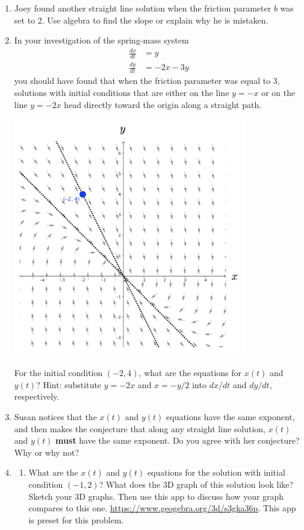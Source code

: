 \begin{enumerate}
\item	Joey found another straight line solution when the friction parameter $b$ was set to 2. Use algebra to find the slope or explain why he is mistaken. \label{10problem7}
\vfill
\clearpage

\item In your investigation of the spring-mass system 
\begin{align*}
\frac{dx}{dt}&=y\\
\frac{dy}{dt}&=-2x-3y
\end{align*}
you should have found that when the friction parameter was equal to 3, solutions with initial conditions that are either on the line $y = -x$ or on the line $y = -2x$ head directly toward the origin along a straight path. \label{10problem8}
\begin{center}
\includegraphics[width=4in]{10/10VectorField1.png}
\end{center}
For the initial condition $(-2, 4)$, what are the equations for $ x(t)$ and $y(t)$? Hint: substitute $y=-2x$ and $x = -y/2$ into $dx/dt$ and $dy/dt$, respectively.
\vfill

\clearpage

\item	Susan notices that the $x(t)$ and $y(t)$ equations have the same exponent, and then makes the conjecture that along any straight line solution, $x(t)$ and $y(t)$ \textbf{must} have the same exponent. Do you agree with her conjecture? Why or why not?  \label{10problem9}
\vfill

\item \label{10problem10}
\begin{enumerate}
\item What are the $x(t)$ and $y(t)$ equations for the solution with initial condition $(-1, 2)$? What does the 3D graph of this solution look like? Sketch your 3D graphs. Then use this app to discuss how your graph compares to this one. \href{https://www.geogebra.org/3d/s3gka36p}{\underline{https://www.geogebra.org/3d/s3gka36p}}. This app is preset for this problem. \label{10problem10parta}


\end{enumerate}
\end{enumerate}
